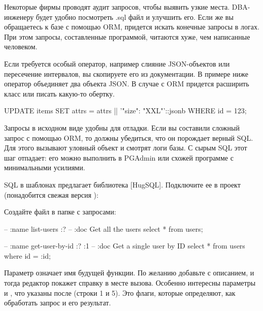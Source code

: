Некоторые фирмы проводят аудит запросов, чтобы выявить узкие места. DBA-инженеру будет удобно посмотреть .sql файл и улучшить его. Если же вы обращаетесь к базе с помощью ORM, придется искать конечные запросы в логах. При этом запросы, составленные программой, читаются хуже, чем написанные человеком.

Если требуется особый оператор, например слияние JSON-объектов или пересечение интервалов, вы скопируете его из документации. В примере ниже оператор \code{||} объединяет два объекта JSON. В случае с ORM придется расширить класс или писать какую-то обертку.

\begin{english}
  \begin{sql}
UPDATE items
  SET attrs = attrs || '{"size": "XXL"}'::jsonb
  WHERE id = 123;
  \end{sql}
\end{english}

Запросы в исходном виде удобны для отладки. Если вы составили сложный запрос с помощью ORM, то должны убедиться, что он порождает верный SQL. Для этого вызывают уловный объект  и смотрят логи базы. С сырым SQL этот шаг отпадает: его можно выполнить в PGAdmin или схожей программе с минимальными усилиями.

\def\urlhugsqlorg{https://www.hugsql.org/}
\def\urlhugsqlgh{https://github.com/layerware/hugsql}

SQL в шаблонах предлагает библиотека \footurl{HugSQL}{\urlhugsqlorg}[HugSQL]. Подключите ее в проект (понадобится свежая версия ):

\begin{english}
  \begin{clojure}
  \end{clojure}
\end{english}

Создайте файл  в папке  с запросами:

\begin{english}
  \begin{sql/lines}
-- :name list-users :?
-- :doc Get all the users
select * from users;

-- :name get-user-by-id :? :1
-- :doc Get a single user by ID
select * from users
where id = :id;
  \end{sql/lines}
\end{english}

Параметр  означает имя будущей функции. По желанию добавьте  с описанием, и тогда редактор покажет справку в месте вызова. Особенно интересны параметры  и , что указаны после  (строки 1 и 5). Это флаги, которые определяют, как обработать запрос и его результат.

